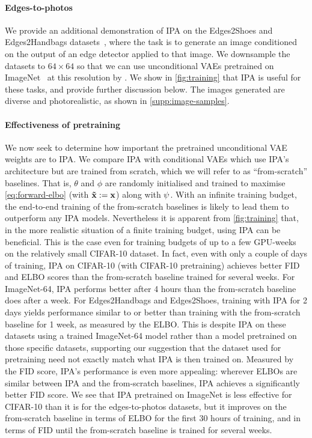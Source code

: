 \paragraph{Edges-to-photos}
We provide an additional demonstration of IPA on the Edges2Shoes and
Edges2Handbags datasets~\citep{isola2016image}, where the task is to generate an
image conditioned on the output of an edge detector applied to that image. We
downsample the datasets to $64\times64$ so that we can use unconditional VAEs
pretrained on ImageNet~\citep{deng2009imagenet} at this resolution by
\citet{child2020very}. We show in \cref{fig:training} that IPA is useful for
these tasks, and provide further discussion below. The images generated are
diverse and photorealistic, as shown in \cref{supp:image-samples}.

\paragraph{Effectiveness of pretraining}
We now seek to determine how important the pretrained unconditional VAE weights
are to IPA. We compare IPA with conditional VAEs which use IPA's architecture
but are trained from scratch, which we will refer to as ``from-scratch''
baselines. That is, $\theta$ and $\phi$ are randomly initialised and trained to
maximise \cref{eq:forward-elbo} (with $\mathbf{\tilde{x}}{} := \mathbf{x}{}$) along with
$\psi$.
%
With an infinite training budget, the end-to-end training of the from-scratch
baselines is likely to lead them to outperform any IPA models. Nevertheless it
is apparent from \cref{fig:training} that, in the more realistic situation of a
finite training budget, using IPA can be beneficial. This is the case even for
training budgets of up to a few GPU-weeks on the relatively small CIFAR-10
dataset. In fact, even with only a couple of days of training, IPA on CIFAR-10
(with CIFAR-10 pretraining) achieves better FID and ELBO scores than the
from-scratch baseline trained for several weeks. For ImageNet-64, IPA performs
better after 4 hours than the from-scratch baseline does after a week.
%
For Edges2Handbags and Edges2Shoes, training with IPA for 2 days yields
performance similar to or better than training with the from-scratch baseline
for 1 week, as measured by the ELBO. This is despite IPA on these datasets using
a trained ImageNet-64 model rather than a model pretrained on those specific
datasets, supporting our suggestion that the dataset used for pretraining need
not exactly match what IPA is then trained on.
%
Measured by the FID score, IPA's performance is even more appealing: wherever
ELBOs are similar between IPA and the from-scratch baselines, IPA achieves a
significantly better FID score.
%
We see that IPA pretrained on ImageNet is less effective for CIFAR-10
than it is for the edges-to-photos datasets, but it improves on the from-scratch
baseline in terms of ELBO for the first 30 hours of training, and in terms of
FID until the from-scratch baseline is trained for several weeks.

